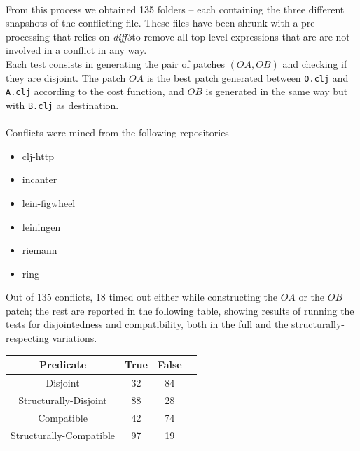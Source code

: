 \documentclass[11pt, titlepage]{article}
\newcommand{\diffthree}{\emph{diff3}}
\begin{document}
\\
From this process we obtained 135 folders -- each containing the three different snapshots of the conflicting file. These files have been shrunk with a pre-processing that relies on \diffthree to remove all top level expressions that are are not involved in a conflict in any way.
\\
Each test consists in generating the pair of patches $(OA,OB)$ and checking if they are disjoint. 
The patch $OA$ is the best patch generated between \texttt{O.clj} and \texttt{A.clj} according to the cost function, and $OB$ is generated in the same way but with \texttt{B.clj} as destination.
\\
\\
Conflicts were mined from the following repositories
 \begin{itemize}
    \item clj-http
    \item incanter
    \item lein-figwheel
    \item leiningen
    \item riemann
    \item ring
 \end{itemize}

Out of 135 conflicts, 18 timed out either while constructing the $OA$ or the $OB$ patch; the rest are reported in the following table, showing results of running the tests for disjointedness and compatibility, both in the full and the structurally-respecting variations. 
\\
\begin{center}
 \begin{tabular} { ||c|c|c|c|| }
   \hline Predicate & True & False  \\
   \hline
   \hline Disjoint & 32 & 84 \\
   \hline Structurally-Disjoint & 88 & 28 \\
   \hline Compatible & 42 & 74 \\
   \hline Structurally-Compatible & 97 & 19 \\
   \hline
 \end{tabular}
\end{center}
\end{document}
